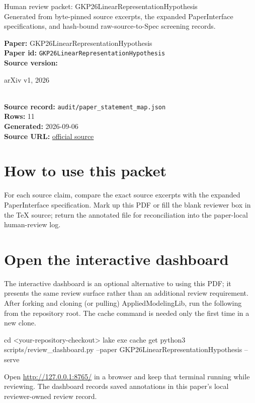\documentclass[10pt]{article}
\begin{document}
\fontsize{9}{10}\selectfont

\begin{center}
{\LARGE Human review packet: GKP26LinearRepresentationHypothesis}\\[0.35em]
\small Generated from byte-pinned source excerpts, the expanded PaperInterface
specifications, and hash-bound raw-source-to-Spec screening records.
\end{center}

\noindent\textbf{Paper:} GKP26LinearRepresentationHypothesis\\
\textbf{Paper id:} \texttt{GKP26LinearRepresentationHypothesis}\\
\textbf{Source version:} \parbox[t]{0.76\linewidth}{\raggedright arXiv v1, 2026}\\
\textbf{Source record:} \texttt{audit/paper\_statement\_map.json}\\
\textbf{Rows:} 11\\
\textbf{Generated:} 2026-09-06\\
\textbf{Source URL:} \href{https://arxiv.org/abs/2602.11246}{official source}





\section*{How to use this packet}
For each source claim, compare the exact source excerpts with the expanded
PaperInterface specification. Mark up this PDF or fill the blank reviewer box in the TeX source;
return the annotated file for reconciliation into the paper-local human-review
log.

\section*{Open the interactive dashboard}
The interactive dashboard is an optional alternative to using this PDF; it
presents the same review surface rather than an additional review requirement.
After forking and cloning (or pulling) AppliedModelingLib, run the following from the
repository root. The cache command is needed only the first time in a new clone.
\begin{ReviewVerbatim}
cd <your-repository-checkout>
lake exe cache get
python3 scripts/review_dashboard.py --paper GKP26LinearRepresentationHypothesis --serve
\end{ReviewVerbatim}
Open \url{http://127.0.0.1:8765/} in a browser and keep that terminal running
while reviewing. The dashboard records saved annotations in this paper's local
reviewer-owned review record.
\end{document}
